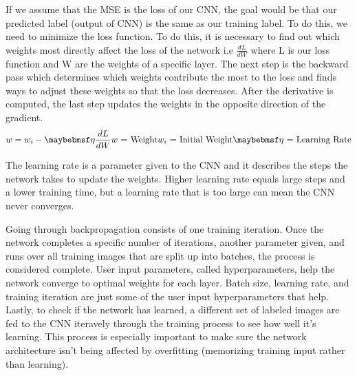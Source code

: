 If we assume that the MSE is the loss of our CNN, the goal would be that our predicted label (output of CNN) is the same as our training label. To do this, we need to minimize the loss function. To do this, it is necessary to find out which weights most directly affect the loss of the network i.e $\frac{dL}{dW}$ where L is our loss function and W are the weights of a specific layer. The next step is the backward pass which determines which weights contribute the most to the loss and finds ways to adjust these weights so that the loss decreases. After the derivative is computed, the last step updates the weights in the opposite direction of the gradient. 
\begin{equation}
w=w_i - \eta\frac{dL}{dW}
\\\text{$w$ = Weight}
\\\text{$w_i$ = Initial Weight}
\\\text{$\eta$ = Learning Rate}
\end{equation}

The learning rate is a parameter given to the CNN and it describes the steps the network takes to update the weights. Higher learning rate equals large steps and a lower training time, but a learning rate that is too large can mean the CNN never converges. 

Going through backpropagation consists of one training iteration. Once the network completes a specific number of iterations, another parameter given, and runs over all training images that are split up into batches, the process is considered complete. User input parameters, called hyperparameters, help the network converge to optimal weights for each layer. Batch size, learning rate, and training iteration are just some of the user input hyperparameters that help. Lastly, to check if the network has learned, a different set of labeled images are fed to the CNN iteravely through the training process to see how well it's learning. This process is especially important to make sure the network architecture isn't being affected by overfitting (memorizing training input rather than learning). 

